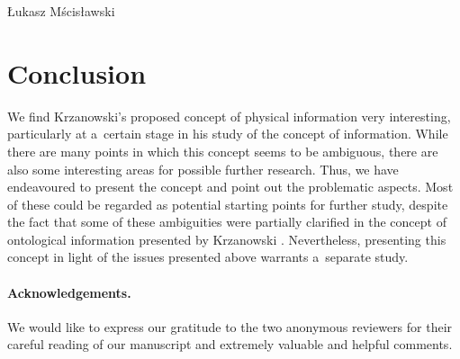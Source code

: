 \begin{artengenv}{Łukasz Mścisławski}
\section{Conclusion}
We find Krzanowski's proposed concept of physical information very interesting, particularly at a~certain stage in his study of the concept of information. While there are many points in which this concept seems to be ambiguous, there are also some interesting areas for possible further research. Thus, we have endeavoured to present the concept and point out the problematic aspects. Most of these could be regarded as potential starting points for further study, despite the fact that some of these ambiguities were partially clarified in the concept of ontological information presented by Krzanowski
\parencite*[][]{krzanowski_ontological_2022}. %
 Nevertheless, presenting this concept in light of the issues presented above warrants a~separate study.

\paragraph{Acknowledgements.}
We would like to express our gratitude to the two anonymous reviewers for their careful reading of our manuscript and extremely valuable and helpful comments.

\end{artengenv}

